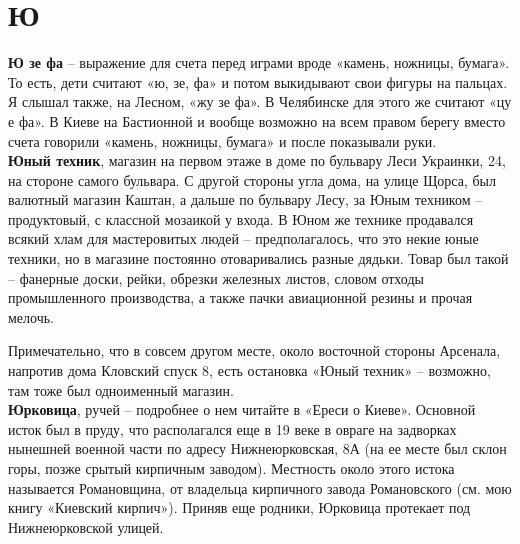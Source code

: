 \chapter*{Ю}

\textbf{Ю зе фа} – выражение для счета перед играми вроде «камень, ножницы, бумага». То есть, дети считают «ю, зе, фа» и потом выкидывают свои фигуры на пальцах. Я слышал также, на Лесном, «жу зе фа». В Челябинске для этого же считают «цу е фа». В Киеве на Бастионной и вообще возможно на всем правом берегу вместо счета говорили «камень, ножницы, бумага» и после показывали руки.\\

\textbf{Юный техник}, магазин на первом этаже в доме по бульвару Леси Украинки, 24, на стороне самого бульвара. С другой стороны угла дома, на улице Щорса, был валютный магазин Каштан, а дальше по бульвару Лесу, за Юным техником – продуктовый, с классной мозаикой у входа. В Юном же технике продавался всякий хлам для мастеровитых людей – предполагалось, что это некие юные техники, но в магазине постоянно отоваривались разные дядьки. Товар был такой – фанерные доски, рейки, обрезки железных листов, словом отходы промышленного производства, а также пачки авиационной резины и прочая мелочь.

Примечательно, что в совсем другом месте, около восточной стороны Арсенала, напротив дома Кловский спуск 8, есть остановка «Юный техник» – возможно, там тоже был одноименный магазин.\\

\textbf{Юрковица}, ручей – подробнее о нем читайте в «Ереси о Киеве». Основной исток был в пруду, что располагался еще в 19 веке в овраге на задворках нынешней военной части по адресу Нижнеюрковская, 8А (на ее месте был склон горы, позже срытый кирпичным заводом). Местность около этого истока называется Романовщина, от владельца кирпичного завода Романовского (см. мою книгу «Киевский кирпич»). Приняв еще родники, Юрковица протекает под Нижнеюрковской улицей.
